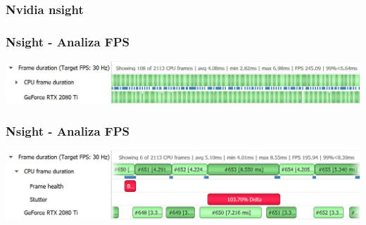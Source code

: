 \documentclass{beamer}
\begin{document}
          \frametitle{Nvidia nsight}
          {
            \begin{frame}
            \end{frame}
            }
            
          \begin{frame}
          \frametitle{Nsight - Analiza FPS}
          \center
          \includegraphics[width=1\textwidth]{fps_overview.png}
          \end{frame}

          \begin{frame}
            \frametitle{Nsight - Analiza FPS}
            \center
            \includegraphics[width=1\textwidth]{stutter_row.png}
            \end{frame}
\end{document}
